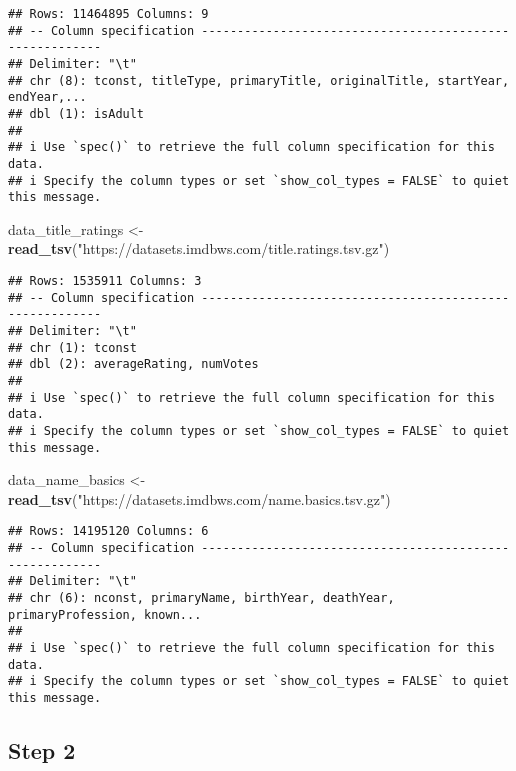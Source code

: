 \documentclass[
]{article}
\newenvironment{Shaded}{\begin{snugshade}}{\end{snugshade}}
\newcommand{\FunctionTok}[1]{\textcolor[rgb]{0.13,0.29,0.53}{\textbf{#1}}}
\newcommand{\NormalTok}[1]{#1}
\newcommand{\OtherTok}[1]{\textcolor[rgb]{0.56,0.35,0.01}{#1}}
\newcommand{\StringTok}[1]{\textcolor[rgb]{0.31,0.60,0.02}{#1}}
\begin{document}
\begin{verbatim}
## Rows: 11464895 Columns: 9
## -- Column specification --------------------------------------------------------
## Delimiter: "\t"
## chr (8): tconst, titleType, primaryTitle, originalTitle, startYear, endYear,...
## dbl (1): isAdult
## 
## i Use `spec()` to retrieve the full column specification for this data.
## i Specify the column types or set `show_col_types = FALSE` to quiet this message.
\end{verbatim}

\begin{Shaded}
\begin{Highlighting}[]
\NormalTok{data\_title\_ratings }\OtherTok{\textless{}{-}} \FunctionTok{read\_tsv}\NormalTok{(}\StringTok{"https://datasets.imdbws.com/title.ratings.tsv.gz"}\NormalTok{)}
\end{Highlighting}
\end{Shaded}

\begin{verbatim}
## Rows: 1535911 Columns: 3
## -- Column specification --------------------------------------------------------
## Delimiter: "\t"
## chr (1): tconst
## dbl (2): averageRating, numVotes
## 
## i Use `spec()` to retrieve the full column specification for this data.
## i Specify the column types or set `show_col_types = FALSE` to quiet this message.
\end{verbatim}

\begin{Shaded}
\begin{Highlighting}[]
\NormalTok{data\_name\_basics }\OtherTok{\textless{}{-}} \FunctionTok{read\_tsv}\NormalTok{(}\StringTok{"https://datasets.imdbws.com/name.basics.tsv.gz"}\NormalTok{)}
\end{Highlighting}
\end{Shaded}

\begin{verbatim}
## Rows: 14195120 Columns: 6
## -- Column specification --------------------------------------------------------
## Delimiter: "\t"
## chr (6): nconst, primaryName, birthYear, deathYear, primaryProfession, known...
## 
## i Use `spec()` to retrieve the full column specification for this data.
## i Specify the column types or set `show_col_types = FALSE` to quiet this message.
\end{verbatim}

\subsection{Step 2}\label{step-2}
\end{document}
